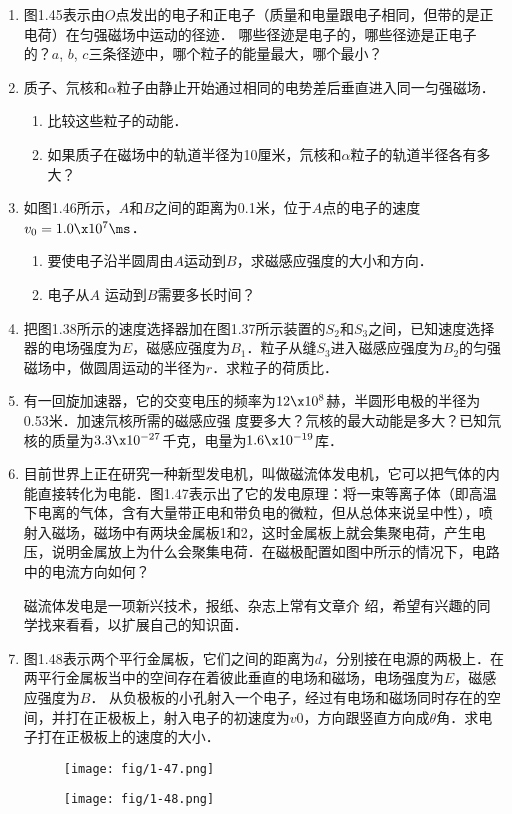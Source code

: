\begin{enumerate}
\item 图1.45表示由$O$点发出的电子和正电子（质量和电量跟电子相同，但带的是正电荷）在匀强磁场中运动的径迹．
哪些径迹是电子的，哪些径迹是正电子的？$a$, $b$, $c$三条径迹中，哪个粒子的能量最大，哪个最小？
\item 质子、氘核和$\alpha$粒子由静止开始通过相同的电势差后垂直进入同一匀强磁场．
\begin{enumerate}
    \item 比较这些粒子的动能．
    \item 如果质子在磁场中的轨道半径为10厘米，氘核和$\alpha$粒子的轨道半径各有多大？
\end{enumerate}
\item 如图1.46所示，$A$和$B$之间的距离为0.1米，位于$A$点的电子的速度$v_0=1.0\x10^7\ms$．
\begin{enumerate}
    \item 要使电子沿半圆周由$A$运动到$B$，求磁感应强度的大小和方向．
    \item 电子从$A$
运动到$B$需要多长时间？
\end{enumerate}
\item 把图1.38所示的速度选择器加在图1.37所示装置的$S_2$和$S_3$之间，已知速度选择器的电场强度为$E$，磁感应强度为$B_1$．粒子从缝$S_3$进入磁感应强度为$B_2$的匀强磁场中，做圆周运动的半径为$r$．求粒子的荷质比．
\item  有一回旋加速器，它的交变电压的频率为$12\x10^8$赫，半圆形电极的半径为0.53米．加速氘核所需的磁感应强
度要多大？氘核的最大动能是多大？已知氘核的质量为$3.3\x10^{-27}$千克，电量为$1.6\x10^{-19}$库．
\item 目前世界上正在研究一种新型发电机，叫做磁流体发电机，它可以把气体的内能直接转化为电能．图1.47表示出了它的发电原理：将一束等离子体（即高温下电离的气体，含有大量带正电和带负电的微粒，但从总体来说呈中性），喷射入磁场，磁场中有两块金属板1和2，这时金属板上就会集聚电荷，产生电压，说明金属放上为什么会聚集电荷．在磁极配置如图中所示的情况下，电路中的电流方向如何？

磁流体发电是一项新兴技术，报纸、杂志上常有文章介
绍，希望有兴趣的同学找来看看，以扩展自己的知识面．
\item  图1.48表示两个平行金属板，它们之间的距离为$d$，分别接在电源的两极上．在两平行金属板当中的空间存在着彼此垂直的电场和磁场，电场强度为$E$，磁感应强度为$B$． 从负极板的小孔射入一个电子，经过有电场和磁场同时存在的空间，并打在正极板上，射入电子的初速度为$v0$，方向跟竖直方向成$\theta$角．求电子打在正极板上的速度的大小．

\begin{figure}[htp]\centering
	\texttt{[image: fig/1-47.png]}
	\caption{ }
\end{figure}\begin{figure}[htp]\centering
\texttt{[image: fig/1-48.png]}
\caption{ }
\end{figure}
\end{enumerate}